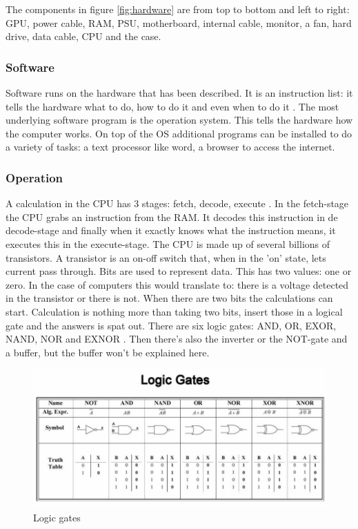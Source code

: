 The components in figure \ref{fig:hardware} are from top to bottom and left to right: GPU, power cable, RAM, PSU, motherboard, internal cable, monitor, a fan, hard drive, data cable, CPU and the case.


\subsubsection{Software} \label{software}
Software runs on the hardware that has been described. It is an instruction list: it tells the hardware what to do, how to do it and even when to do it \autocite{software}.
The most underlying software program is the operation system. This tells the hardware how the computer works. On top of the OS additional programs can be installed to do a variety of tasks: a text processor like word, a browser to access the internet.


\subsubsection{Operation} \label{working}
A calculation in the CPU has 3 stages: fetch, decode, execute \autocite{cpu}.
In the fetch-stage the CPU grabs an instruction from the RAM. It decodes this instruction in de decode-stage and finally when it exactly knows what the instruction means, it executes this in the execute-stage.
The CPU is made up of several billions of transistors. A transistor is an on-off switch that, when in the 'on' state, lets current pass through.
Bits are used to represent data. This has two values: one or zero\autocite{bit}. In the case of computers this would translate to: there is a voltage detected in the transistor or there is not.
When there are two bits the calculations can start. Calculation is nothing more than taking two bits, insert those in a logical gate and the answers is spat out.
There are six logic gates: AND, OR, EXOR, NAND, NOR and EXNOR \autocite{gates}. Then there's also the inverter or the NOT-gate and a buffer, but the buffer won't be explained here.

\begin{figure} [h]
    \centering
    \includegraphics[width=\textwidth]{img/gates.jpg}
        \caption{Logic gates \autocite{imglogic}}
        \label{fig:logicGates}
\end{figure}


